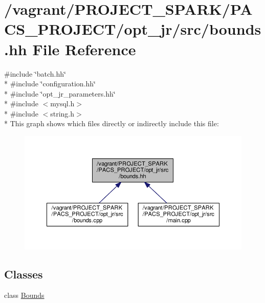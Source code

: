 \hypertarget{bounds_8hh}{\section{/vagrant/\-P\-R\-O\-J\-E\-C\-T\-\_\-\-S\-P\-A\-R\-K/\-P\-A\-C\-S\-\_\-\-P\-R\-O\-J\-E\-C\-T/opt\-\_\-jr/src/bounds.hh File Reference}
\label{bounds_8hh}
}
{\ttfamily \#include \char`\"{}batch.\-hh\char`\"{}}\\*
{\ttfamily \#include \char`\"{}configuration.\-hh\char`\"{}}\\*
{\ttfamily \#include \char`\"{}opt\-\_\-jr\-\_\-parameters.\-hh\char`\"{}}\\*
{\ttfamily \#include $<$mysql.\-h$>$}\\*
{\ttfamily \#include $<$string.\-h$>$}\\*
This graph shows which files directly or indirectly include this file\-:\nopagebreak
\begin{figure}[H]
\begin{center}
\leavevmode
\includegraphics[width=350pt]{bounds_8hh__dep__incl}
\end{center}
\end{figure}
\subsection*{Classes}
\begin{DoxyCompactItemize}
\item 
class \hyperlink{classBounds}{Bounds}
\end{DoxyCompactItemize}
